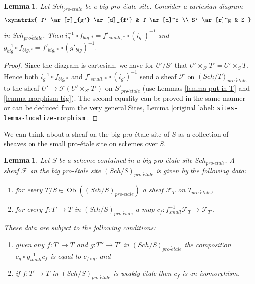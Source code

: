\documentclass[10pt,a4paper]{article}
\theoremstyle{plain}
\newtheorem{lemma}[subsection]{Lemma}
\theoremstyle{definition}
\theoremstyle{remark}
\numberwithin{equation}{subsection}
\def\Sch{\mathit{Sch}}
\def\Ob{\mathop{\mathrm{Ob}}\nolimits}
\def\proetale{{pro\text{-}\acute{e}tale}}
\begin{document}
\begin{lemma}
\label{lemma-morphism-big-small-cartesian-diagram}
Let $\Sch_\proetale$ be a big pro-\'etale site. Consider a cartesian diagram
$$
\xymatrix{
T' \ar[r]_{g'} \ar[d]_{f'} & T \ar[d]^f \\
S' \ar[r]^g & S
}
$$
in $\Sch_\proetale$. Then
$i_g^{-1} \circ f_{big, *} = f'_{small, *} \circ (i_{g'})^{-1}$
and $g_{big}^{-1} \circ f_{big, *} = f'_{big, *} \circ (g'_{big})^{-1}$.
\end{lemma}

\begin{proof}
Since the diagram is cartesian, we have for $U'/S'$
that $U' \times_{S'} T' = U' \times_S T$. Hence both
$i_g^{-1} \circ f_{big, *}$ and $f'_{small, *} \circ (i_{g'})^{-1}$
send a sheaf $\mathcal{F}$ on $(\Sch/T)_\proetale$ to the sheaf
$U' \mapsto \mathcal{F}(U' \times_{S'} T')$ on $S'_\proetale$
(use Lemmas \ref{lemma-put-in-T} and \ref{lemma-morphism-big}).
The second equality can be proved in the same manner or can be
deduced from the very general
Sites, Lemma \textnormal{[original label: \nolinkurl{sites-lemma-localize-morphism}]}.
\end{proof}

\noindent
We can think about a sheaf on the big pro-\'etale site of $S$ as a collection
of sheaves on the small pro-\'etale site on schemes over $S$.

\begin{lemma}
\label{lemma-characterize-sheaf-big}
Let $S$ be a scheme contained in a big pro-\'etale site $\Sch_\proetale$.
A sheaf $\mathcal{F}$ on the big pro-\'etale site $(\Sch/S)_\proetale$
is given by the following data:
\begin{enumerate}
\item for every $T/S \in \Ob((\Sch/S)_\proetale)$ a sheaf
$\mathcal{F}_T$ on $T_\proetale$,
\item for every $f : T' \to T$ in
$(\Sch/S)_\proetale$ a map
$c_f : f_{small}^{-1}\mathcal{F}_T \to \mathcal{F}_{T'}$.
\end{enumerate}
These data are subject to the following conditions:
\begin{enumerate}
\item[(a)] given any $f : T' \to T$ and $g : T'' \to T'$ in
$(\Sch/S)_\proetale$ the composition
$c_g \circ g_{small}^{-1}c_f$ is equal to $c_{f \circ g}$, and
\item[(b)] if $f : T' \to T$ in $(\Sch/S)_\proetale$
is weakly \'etale then $c_f$ is an isomorphism.
\end{enumerate}
\end{lemma}
\end{document}
